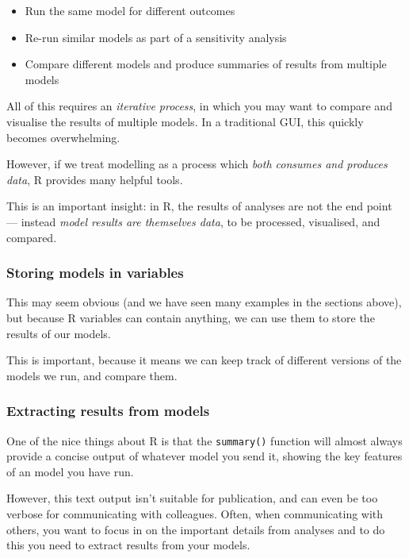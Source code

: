 \documentclass[]{article}
\providecommand{\tightlist}{%
  \setlength{\itemsep}{0pt}\setlength{\parskip}{0pt}}
\begin{document}
\begin{itemize}
\tightlist
\item
  Run the same model for different outcomes
\item
  Re-run similar models as part of a sensitivity analysis
\item
  Compare different models and produce summaries of results from multiple
  models
\end{itemize}

All of this requires an \emph{iterative process}, in which you may want to compare
and visualise the results of multiple models. In a traditional GUI, this quickly
becomes overwhelming.

However, if we treat modelling as a process which \emph{both consumes and produces
data}, R provides many helpful tools.

This is an important insight: in R, the results of analyses are not the end
point --- instead \emph{model results are themselves data}, to be processed,
visualised, and compared.

\hypertarget{storing-models-in-variables}{%
\subsubsection*{Storing models in variables}\label{storing-models-in-variables}}

This may seem obvious (and we have seen many examples in the sections above),
but because R variables can contain anything, we can use them to store the
results of our models.

This is important, because it means we can keep track of different versions of
the models we run, and compare them.

\hypertarget{extract-results-from-models}{%
\subsubsection*{Extracting results from models}\label{extract-results-from-models}}

One of the nice things about R is that the \texttt{summary()} function will almost
always provide a concise output of whatever model you send it, showing the key
features of an model you have run.

However, this text output isn't suitable for publication, and can even be too
verbose for communicating with colleagues. Often, when communicating with
others, you want to focus in on the important details from analyses and to do
this you need to extract results from your models.
\end{document}
